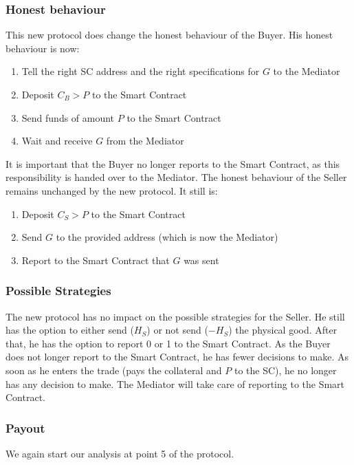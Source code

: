 \documentclass{cacthesis}
\begin{document}
\subsubsection{Honest behaviour}
This new protocol does change the honest behaviour of the Buyer. His honest behaviour is now:
\begin{enumerate}
    \item Tell the right SC address and the right specifications for $G$ to the Mediator
    \item Deposit $C_B>P$ to the Smart Contract
    \item Send funds of amount $P$ to the Smart Contract
    \item Wait and receive $G$ from the Mediator
\end{enumerate}
It is important that the Buyer no longer reports to the Smart Contract, as this responsibility is handed over to the Mediator.\newline
The honest behaviour of the Seller remains unchanged by the new protocol. It still is:
\begin{enumerate}
    \item Deposit $C_S>P$ to the Smart Contract
    \item Send $G$ to the provided address (which is now the Mediator)
    \item Report to the Smart Contract  that $G$ was sent
\end{enumerate}

\subsubsection{Possible Strategies}
The new protocol has no impact on the possible strategies for the Seller. He still has the option to either send ($H_S$) or not send ($-H_S$) the physical good. After that, he has the option to report 0 or 1 to the Smart Contract.\newline
As the Buyer does not longer report to the Smart Contract, he has fewer decisions to make. As soon as he enters the trade (pays the collateral and $P$ to the SC), he no longer has any decision to make. The Mediator will take care of reporting to the Smart Contract.

\subsubsection{Payout}
We again start our analysis at point 5 of the protocol.\newline
\end{document}
